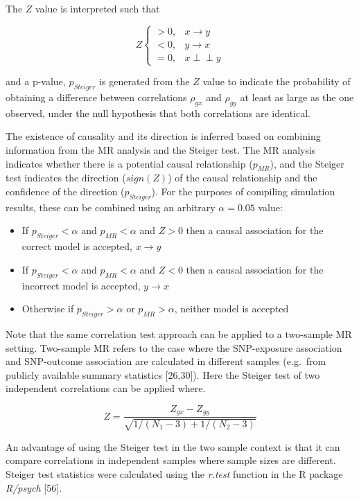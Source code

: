 \documentclass[]{article}
\providecommand{\tightlist}{%
  \setlength{\itemsep}{0pt}\setlength{\parskip}{0pt}}
\begin{document}
The \(Z\) value is interpreted such that

\[
Z \left\{
\begin{array}{ll}
> 0, & x \to y\\
< 0, & y \to x\\
= 0, & x \perp\!\!\!\perp y 
\end{array} \right.
\]

and a p-value, \(p_{Steiger}\) is generated from the \(Z\) value to
indicate the probability of obtaining a difference between correlations
\(\rho_{gx}\) and \(\rho_{gy}\) at least as large as the one observed,
under the null hypothesis that both correlations are identical.

The existence of causality and its direction is inferred based on
combining information from the MR analysis and the Steiger test. The MR
analysis indicates whether there is a potential causal relationship
(\(p_{MR}\)), and the Steiger test indicates the direction (\(sign(Z)\))
of the causal relationship and the confidence of the direction
(\(p_{Steiger}\)). For the purposes of compiling simulation results,
these can be combined using an arbitrary \(\alpha = 0.05\) value:

\begin{itemize}
\tightlist
\item
  If \(p_{Steiger} < \alpha\) and \(p_{MR} < \alpha\) and \(Z > 0\) then
  a causal association for the correct model is accepted,
  \(x \rightarrow y\)
\item
  If \(p_{Steiger} < \alpha\) and \(p_{MR} < \alpha\) and \(Z < 0\) then
  a causal association for the incorrect model is accepted,
  \(y \rightarrow x\)
\item
  Otherwise if \(p_{Steiger} > \alpha\) or \(p_{MR} > \alpha\), neither
  model is accepted
\end{itemize}

Note that the same correlation test approach can be applied to a
two-sample MR setting. Two-sample MR refers to the case where the
SNP-exposure association and SNP-outcome association are calculated in
different samples (e.g.~from publicly available summary statistics
{[}26,30{]}). Here the Steiger test of two independent correlations can
be applied where.

\[
Z = \frac{Z_{gx} - Z_{gy}} { \sqrt{ 1 / (N_{1} - 3) + 1 / (N_{2} - 3) } }
\]

An advantage of using the Steiger test in the two sample context is that
it can compare correlations in independent samples where sample sizes
are different. Steiger test statistics were calculated using the
\emph{r.test} function in the R package \emph{R/psych} {[}56{]}.
\end{document}

